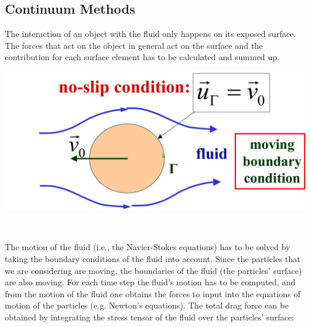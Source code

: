 \subsection{Continuum Methods}

The interaction of an object with the fluid only happens on its exposed surface. The forces that act on the object in general act on the surface and the contribution for each surface element has to be calculated and summed up.


\vspace{0.2cm}
\noindent
\begin{minipage}{.95\textwidth}
  \begin{minipage}{\textwidth}
    \centering
    \includegraphics[width=.85\textwidth]{pics/fluid1.png}
    \label{fig:fluid1}
  \end{minipage}
\hfill
  \begin{minipage}{0.05\textwidth}
\,
  \end{minipage}
\end{minipage}
\vspace{0.2cm}

The motion of the fluid (i.e., the Navier-Stokes equations) has to be solved by taking the boundary conditions of the fluid into account. Since the particles that we are considering are moving, the boundaries of the fluid (the particles' surface) are also moving. For each time step the fluid's motion has to be computed, and from the motion of the fluid one obtains the forces to input into the  equations of motion of the particles (e.g. Newton's equations). The total drag force can be obtained by integrating the stress tensor of the fluid over the particles' surface:

